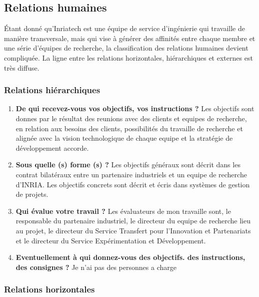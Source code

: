 \documentclass{resume} %
\begin{document}
	\subsection{Relations humaines}
	Étant donné qu'Inriatech est une équipe de service d'ingénierie qui travaille de manière transversale, mais qui vise à générer des affinités entre chaque membre et une série d'équipes de recherche, la classification des relations humaines devient compliquée. La ligne entre les relations horizontales, hiérarchiques et externes est très diffuse.

		\subsubsection {Relations hiérarchiques}
		 \begin{enumerate} 
			\item \textbf{De qui recevez-vous vos objectifs, vos instructions ?}
				Les objectifs sont donnes par le résultat des reunions avec des clients et equipes de recherche, en relation aux besoins des clients, possibilités du travaille de recherche et alignée avec la vision technologique de chaque equipe et la stratégie de développement accorde.
		\item \textbf{Sous quelle (s) forme (s) ?}
				Les objectifs généraux sont décrit dans les contrat bilatéraux entre un partenaire industriels et un equipe de recherche d'INRIA. 
				Les objectifs concrets sont décrit et écris dans systèmes de gestion de projets. 
		\item \textbf{Qui évalue votre travail ?}
				Les évaluateurs de mon travaille sont, le responsable du partenaire industriel, le directeur du equipe de recherche lieu au projet, le directeur du Service Transfert pour l'Innovation et Partenariats et le directeur du Service Expérimentation et Développement. 
		\item  \textbf{Eventuellement à qui donnez-vous des objectifs. des instructions, des consignes ?}
			Je n'ai pas des personnes a charge 
		 \end{enumerate} 

	\subsubsection {Relations horizontales } 
\end{document}
